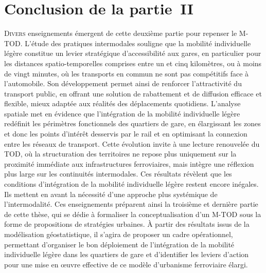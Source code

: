 
\cleardoublepage
\section*{Conclusion de la partie~II
    \label{part2:conclusion}
    }

\lettrine[lines=3, findent=8pt, nindent=0pt]{ D}{ivers} enseignements émergent de cette deuxième partie pour repenser le \acrshort{M-TOD}. L’étude des pratiques intermodales souligne que la mobilité individuelle légère constitue un levier stratégique d’accessibilité aux gares, en particulier pour les distances spatio-temporelles comprises entre un et cinq kilomètres, ou à moins de vingt minutes, où les transports en commun ne sont pas compétitifs face à l’automobile. Son développement permet ainsi de renforcer l’attractivité du transport public, en offrant une solution de rabattement et de diffusion efficace et flexible, mieux adaptée aux réalités des déplacements quotidiens. L’analyse spatiale met en évidence que l’intégration de la mobilité individuelle légère redéfinit les périmètres fonctionnels des quartiers de gare, en élargissant les zones et donc les points d'intérêt desservis par le rail et en optimisant la connexion entre les réseaux de transport. Cette évolution invite à une lecture renouvelée du \acrshort{TOD}, où la structuration des territoires ne repose plus uniquement sur la proximité immédiate aux infrastructures ferroviaires, mais intègre une réflexion plus large sur les continuités intermodales. Ces résultats révèlent que les conditions d’intégration de la mobilité individuelle légère restent encore inégales. Ils mettent en avant la nécessité d’une approche plus systémique de l’intermodalité. Ces enseignements préparent ainsi la troisième et dernière partie de cette thèse, qui se dédie à formaliser la conceptualisation d'un \acrshort{M-TOD} sous la forme de propositions de stratégies urbaines. À partir des résultats issus de la modélisation géostatistique, il s’agira de proposer un cadre opérationnel, permettant d'organiser le bon déploiement de l’intégration de la mobilité individuelle légère dans les quartiers de gare et d’identifier les leviers d’action pour une mise en œuvre effective de ce modèle d’urbanisme ferroviaire élargi.%